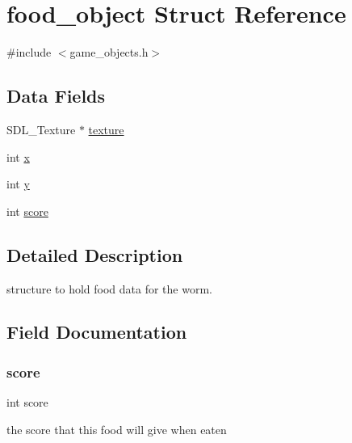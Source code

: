 \hypertarget{structfood__object}{}\section{food\+\_\+object Struct Reference}
\label{structfood__object}


{\ttfamily \#include $<$game\+\_\+objects.\+h$>$}

\subsection*{Data Fields}
\begin{DoxyCompactItemize}
\item 
S\+D\+L\+\_\+\+Texture $\ast$ \mbox{\hyperlink{structfood__object_a859b8efbf9abe8e82757ee5c75a0c97c}{texture}}
\item 
int \mbox{\hyperlink{structfood__object_a6150e0515f7202e2fb518f7206ed97dc}{x}}
\item 
int \mbox{\hyperlink{structfood__object_a0a2f84ed7838f07779ae24c5a9086d33}{y}}
\item 
int \mbox{\hyperlink{structfood__object_aef160b7437d94056f1dc59646cd5b87d}{score}}
\end{DoxyCompactItemize}


\subsection{Detailed Description}
structure to hold food data for the worm. 

\subsection{Field Documentation}
\mbox{\label{structfood__object_aef160b7437d94056f1dc59646cd5b87d}} 
\subsubsection{\texorpdfstring{score}{score}}
{\footnotesize\ttfamily int score}

the score that this food will give when eaten \mbox{\label{structfood__object_a859b8efbf9abe8e82757ee5c75a0c97c}} 
